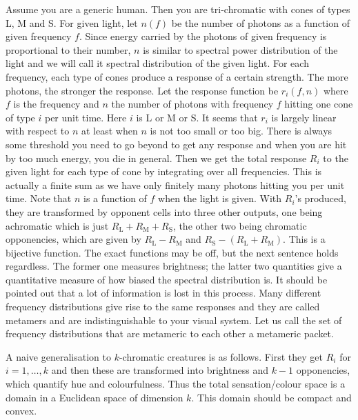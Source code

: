 \documentclass{amsart}
\newcommand {\rL} {\mathrm {L}}
\newcommand {\rM} {\mathrm {M}}
\newcommand {\rS} {\mathrm {S}}
\begin{document}
Assume you are a generic human. Then you are tri-chromatic with cones of types L, M and S. For given light, let $n (f)$ be the number of photons as a function of given frequency $f$. Since  energy carried by the  photons of given frequency is proportional to their number, $n$ is similar to  spectral power distribution of the light and we will call it spectral distribution of the given light. For each frequency, each type of cones produce a response of a certain strength. The more photons, the stronger the response.  Let the response function be $r_i (f,n)$ where $f$ is the frequency and $n$ the number of photons with frequency $f$ hitting one cone of type $i$ per unit time. Here $i$ is L or M or S.  It seems that $r_i$ is largely linear with respect to $n$ at least when $n$ is not too small or too big. There is always some threshold you need to go beyond to get any response and when you are hit by too much energy, you die in general. Then we get the total response $R_i$ to the given light for each type of cone by integrating over all frequencies. This is actually a finite sum as we have only finitely many photons hitting you per unit time. Note that $n$ is a function of $f$ when the light is given. With $R_i$'s produced, they are transformed by opponent cells into three other outputs, one being achromatic  which  is just  $R_\rL+R_\rM+R_\rS$, the other two being chromatic opponencies, which  are given by $R_\rL-R_\rM$ and $R_\rS- (R_\rL+ R_\rM)$. This is a bijective function. The exact functions may be off, but the next sentence holds regardless.  The former one  measures brightness; the latter two quantities give a quantitative measure of how biased the spectral distribution is. It should be pointed out that a lot of information is lost in this process. Many different frequency distributions give rise to the same responses and they are called metamers and are indistinguishable to your visual system. Let us call the set of  frequency distributions that are metameric to each other a metameric packet.

A naive generalisation to $k$-chromatic creatures is as follows. First they get $R_i$ for $i=1,\ldots,k$ and then these are transformed into brightness and $k-1$  opponencies, which quantify hue and colourfulness. Thus the total sensation/colour space is a domain in a Euclidean space of dimension $k$. This domain should be compact and convex.
\end{document}
